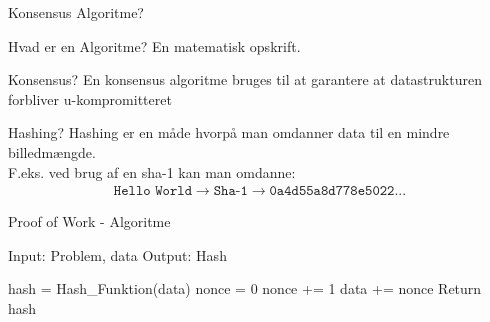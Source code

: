 \documentclass[12pt,t]{beamer}
\begin{document}
\begin{frame}{Konsensus Algoritme?}
\begin{block}{Hvad er en Algoritme?}
	En matematisk opskrift.	
\end{block}
\begin{block}{Konsensus?}
	En konsensus algoritme bruges til at garantere at datastrukturen forbliver u-kompromitteret 	
\end{block}
\begin{block}{Hashing?}
	Hashing er en måde hvorpå man omdanner data til en mindre billedmængde.\\ F.eks. ved brug af en sha-1 kan man omdanne:
	\begin{align*}
	\texttt{Hello World} \rightarrow \texttt{Sha-1} \rightarrow  \texttt{0a4d55a8d778e5022...}
	\end{align*}
\end{block}
\end{frame}


\begin{frame}
\begin{block}{Proof of Work - Algoritme}
	\vspace{-1.5em}
	\begin{algorithm}[H]
		\caption{\newline Input: Problem, data
			\newline Output: Hash
		}
		\begin{algorithmic}
			\State hash = Hash\_Funktion(data)
			\State nonce = 0
			\State nonce += 1
			\State data += nonce
			\EndWhile
			\State 	Return hash
		\end{algorithmic}
	\end{algorithm}
\end{block}
\end{frame}
\end{document}
